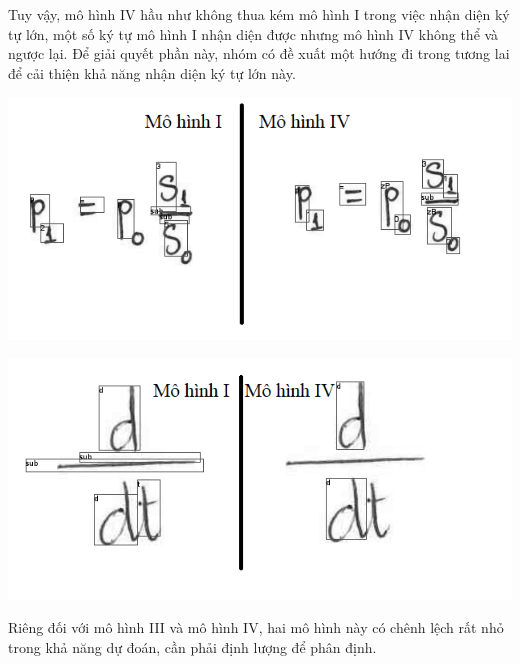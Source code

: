 \documentclass[a4paper,12pt]{article}
\begin{document}
	Tuy vậy, mô hình IV hầu như không thua kém mô hình I trong việc nhận diện ký tự lớn, một số ký tự mô hình I nhận diện được nhưng mô hình IV không thể và ngược lại. Để giải quyết phần này, nhóm có đề xuất một hướng đi trong tương lai để cải thiện khả năng nhận diện ký tự lớn này.
	
	\begin{center}
		\centering
		\includegraphics[width=0.775\linewidth]{compare_8.png}
		\vspace{0.5cm}
		
	\end{center}
	
	\begin{center}
		\centering
		\includegraphics[width=0.775\linewidth]{compare_9.png}
		\vspace{0.5cm}
		
	\end{center}
	
	Riêng đối với mô hình III và mô hình IV, hai mô hình này có chênh lệch rất nhỏ trong khả năng dự đoán, cần phải định lượng để phân định.
	
\end{document}
